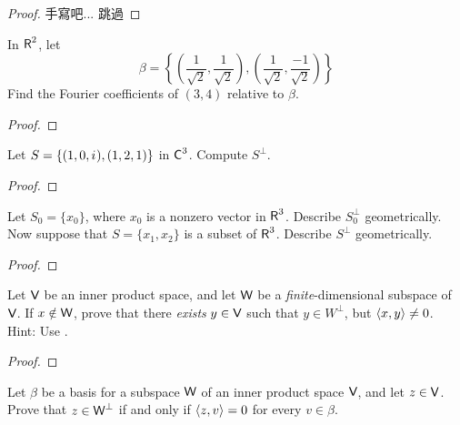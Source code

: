 \begin{proof}
手寫吧... 跳過
\end{proof}

\begin{exercise} \label{exercise 6.2.3}
In \(\textsf{R}^2\), let
\[
    \beta = \left\{
        \left( \frac{1}{\sqrt{2}}, \frac{1}{\sqrt{2}} \right), \left( \frac{1}{\sqrt{2}}, \frac{-1}{\sqrt{2}} \right)
    \right\}
\]
Find the Fourier coefficients of \((3, 4)\) relative to \(\beta\).
\end{exercise}

\begin{proof}
\end{proof}

\begin{exercise} \label{exercise 6.2.4}
Let \(S = \{ (1, 0, {i\mkern1mu}), (1, 2, 1) \}\) in \(\textsf{C}^3\). Compute \(S^{\perp}\).
\end{exercise}

\begin{proof}
\end{proof}

\begin{exercise} \label{exercise 6.2.5}
Let \(S_0 = \{ x_0 \}\), where \(x_0\) is a nonzero vector in \(\textsf{R}^3\).
Describe \(S_0^{\perp}\) geometrically.
Now suppose that \(S = \{ x_1, x_2 \}\) is a \LID{} subset of \(\textsf{R}^3\).
Describe \(S^{\perp}\) geometrically.
\end{exercise}

\begin{proof}
\end{proof}

\begin{exercise} \label{exercise 6.2.6}
Let \(\textsf{V}\) be an inner product space, and let \(\textsf{W}\) be a \emph{finite}-dimensional subspace of \(\textsf{V}\).
If \(x \notin \textsf{W}\), prove that there \emph{exists} \(y \in \textsf{V}\) such that \(y \in W^{\perp}\), but \(\left< x, y \right> \ne 0\).
Hint: Use .
\end{exercise}

\begin{proof}
\end{proof}

\begin{exercise} \label{exercise 6.2.7}
Let \(\beta\) be a basis for a subspace \(\textsf{W}\) of an inner product space \(\textsf{V}\), and let \(z \in \textsf{V}\).
Prove that \(z \in \textsf{W}^{\perp}\) if and only if \(\left< z, v \right> = 0\) for every \(v \in \beta\).
\end{exercise}

